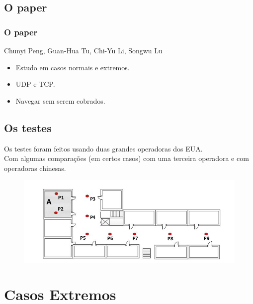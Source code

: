 \documentclass[brazil]{beamer}
\begin{document}
\subsection{O paper}
\begin{frame}[fragile]
    \frametitle{O paper}
    \begin{center}
        Chunyi Peng, Guan-Hua Tu, Chi-Yu Li, Songwu Lu
    \end{center}
    \vspace{0.4cm}
    \begin{itemize}
        \item Estudo em casos normais e extremos.
        \item UDP e TCP.
        \item Navegar sem serem cobrados.

    \end{itemize}
\end{frame}

\subsection{Os testes}
\begin{frame}[fragile]
    Os testes foram feitos usando duas grandes operadoras dos EUA. \\
    Com algumas comparações (em certos casos) com uma terceira operadora e com operadoras chinesas.
\end{frame}

\begin{frame}
    \begin{figure}
    \begin{center}
        \includegraphics[scale=0.3]{images/sala.jpg}
    \end{center}
    \end{figure}
\end{frame}


\section{Casos Extremos}
\end{document}
